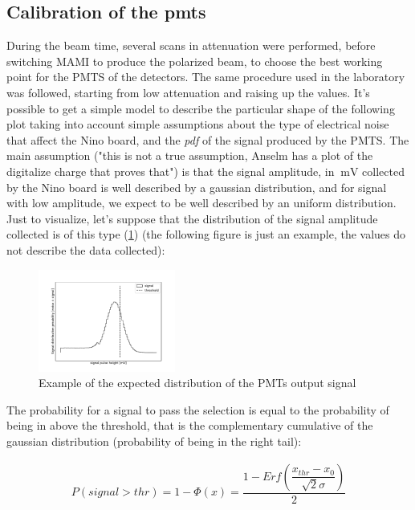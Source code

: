 \subsection{Calibration of the pmts}


During the beam time, several scans in attenuation were performed, before switching MAMI to produce the polarized beam, to choose the best working point for the PMTS of the detectors. The same procedure used in the laboratory was followed, starting from low attenuation and raising up the values. It's possible to get a simple model to describe the particular shape of the following plot taking into account simple assumptions about the type of electrical noise that affect the Nino board, and the \textit{pdf} of the signal produced by the PMTS.
The main assumption ("this is not a true assumption, Anselm has a plot of the digitalize charge that proves that") is that the signal amplitude, in $\SI{}{\milli \volt}$ collected by the Nino board is well described by a gaussian distribution, and for signal with low amplitude, we expect to be well described by an uniform distribution. Just to visualize, let's suppose that the distribution of the signal amplitude collected is of this type (\ref{fig:PDF}) (the following figure is just an example, the values ​​do not describe the data collected):

\begin{figure}[hbtp]
\centering
\includegraphics[width = 0.40\textwidth]{Analysis/distribution.pdf}
\caption{Example of the expected distribution of the PMTs output signal}
\label{fig:PDF}
\end{figure}

The probability for a signal to pass the selection is equal to the probability of being in above the threshold, that is the complementary cumulative of the gaussian distribution (probability of being in the right tail):

\begin{align*}
P(signal > thr) = 1 - \Phi(x) = \dfrac{1 - Erf(\dfrac{x_{thr} - x_{0}}{\sqrt{2} \sigma })}{2}
\end{align*}

